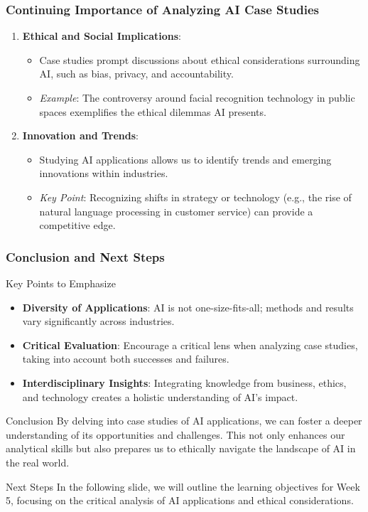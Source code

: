 \documentclass{beamer}
\begin{document}
\begin{frame}[fragile]
    \frametitle{Continuing Importance of Analyzing AI Case Studies}
    \begin{enumerate}[resume]
        \item \textbf{Ethical and Social Implications}: 
            \begin{itemize}
                \item Case studies prompt discussions about ethical considerations surrounding AI, such as bias, privacy, and accountability.
                \item \textit{Example}: The controversy around facial recognition technology in public spaces exemplifies the ethical dilemmas AI presents.
            \end{itemize}
        \item \textbf{Innovation and Trends}:
            \begin{itemize}
                \item Studying AI applications allows us to identify trends and emerging innovations within industries.
                \item \textit{Key Point}: Recognizing shifts in strategy or technology (e.g., the rise of natural language processing in customer service) can provide a competitive edge.
            \end{itemize}
    \end{enumerate}
\end{frame}

\begin{frame}[fragile]
    \frametitle{Conclusion and Next Steps}
    \begin{block}{Key Points to Emphasize}
        \begin{itemize}
            \item \textbf{Diversity of Applications}: AI is not one-size-fits-all; methods and results vary significantly across industries.
            \item \textbf{Critical Evaluation}: Encourage a critical lens when analyzing case studies, taking into account both successes and failures.
            \item \textbf{Interdisciplinary Insights}: Integrating knowledge from business, ethics, and technology creates a holistic understanding of AI’s impact.
        \end{itemize}
    \end{block}
    \begin{block}{Conclusion}
        By delving into case studies of AI applications, we can foster a deeper understanding of its opportunities and challenges. This not only enhances our analytical skills but also prepares us to ethically navigate the landscape of AI in the real world.
    \end{block}
    \begin{block}{Next Steps}
        In the following slide, we will outline the learning objectives for Week 5, focusing on the critical analysis of AI applications and ethical considerations.
    \end{block}
\end{frame}
\end{document}
